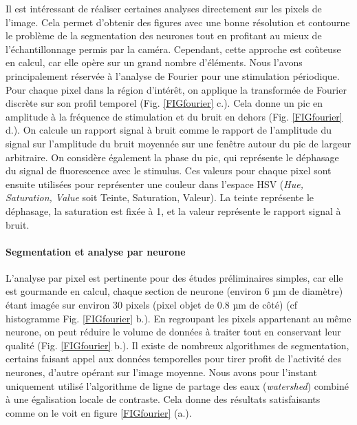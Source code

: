 Il est intéressant de réaliser certaines analyses directement sur les pixels de l'image. Cela permet d'obtenir des figures avec une bonne résolution et contourne le problème de la segmentation des neurones tout en profitant au mieux de l'échantillonnage permis par la caméra. Cependant, cette approche est coûteuse en calcul, car elle opère sur un grand nombre d'éléments. Nous l'avons principalement réservée à l'analyse de Fourier pour une stimulation périodique.
Pour chaque pixel dans la région d'intérêt, on applique la transformée de Fourier discrète sur son profil temporel (Fig. \ref{FIGfourier} c.). Cela donne un pic en amplitude à la fréquence de stimulation et du bruit en dehors (Fig. \ref{FIGfourier} d.). On calcule un rapport signal à bruit comme le rapport de l'amplitude du signal sur l'amplitude du bruit moyennée sur une fenêtre autour du pic de largeur arbitraire. On considère également la phase du pic, qui représente le déphasage du signal de fluorescence avec le stimulus.
Ces valeurs pour chaque pixel sont ensuite utilisées pour représenter une couleur dans l'espace HSV (\emph{Hue, Saturation, Value} soit Teinte, Saturation, Valeur). La teinte représente le déphasage, la saturation est fixée à 1, et la valeur représente le rapport signal à bruit. 

\paragraph{Segmentation et analyse par neurone}

L'analyse par pixel est pertinente pour des études préliminaires simples, car elle est gourmande en calcul, chaque section de neurone (environ 6 µm de diamètre) étant imagée sur environ 30 pixels (pixel objet de 0.8 µm de côté) (cf histogramme Fig. \ref{FIGfourier} b.). En regroupant les pixels appartenant au même neurone, on peut réduire le volume de données à traiter tout en conservant leur qualité (Fig. \ref{FIGfourier} b.). Il existe de nombreux algorithmes de segmentation, certains faisant appel aux données temporelles pour tirer profit de l'activité des neurones, d'autre opérant sur l'image moyenne. Nous avons pour l'instant uniquement utilisé l'algorithme de ligne de partage des eaux (\emph{watershed}) combiné à une égalisation locale de contraste. Cela donne des résultats satisfaisants comme on le voit en figure \ref{FIGfourier} (a.).


